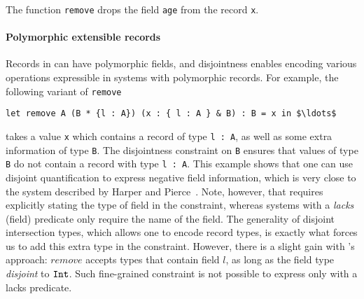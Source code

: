 \noindent The function \lstinline{remove} drops the field
\lstinline{age} from the record \lstinline{x}. 

\paragraph{Polymorphic extensible records} Records in \name can have
polymorphic fields, and disjointness enables encoding various
operations expressible in systems with polymorphic records. For example, 
the following variant of \lstinline{remove}

\begin{lstlisting}[mathescape=true]
let remove A (B * {l : A}) (x : { l : A } & B) : B = x in $\ldots$ 
\end{lstlisting}

\noindent takes a value \lstinline{x} which contains a record of type
\lstinline{l : A}, as well as some extra information of type
\lstinline{B}. The disjointness constraint on \lstinline{B} ensures
that values of type \lstinline{B} do not contain a record with type
\lstinline{l : A}.  This example shows that one
can use disjoint quantification to express negative field information,
which is very close to the system described by Harper and
Pierce~\cite{harper1991record}.  Note, however, that \name requires
explicitly stating the type of field in the constraint, whereas
systems with a \emph{lacks} (field) predicate only require the name of the field.
The generality of disjoint intersection types, which allows one to
encode record types, is exactly what forces us to add this extra type
in the constraint.  However, there is a slight gain with \name's
approach: $remove$ accepts types that contain field $l$, as long as
the field type \emph{disjoint} to $\texttt{Int}$. Such fine-grained
constraint is not possible to express only with a lacks predicate.

